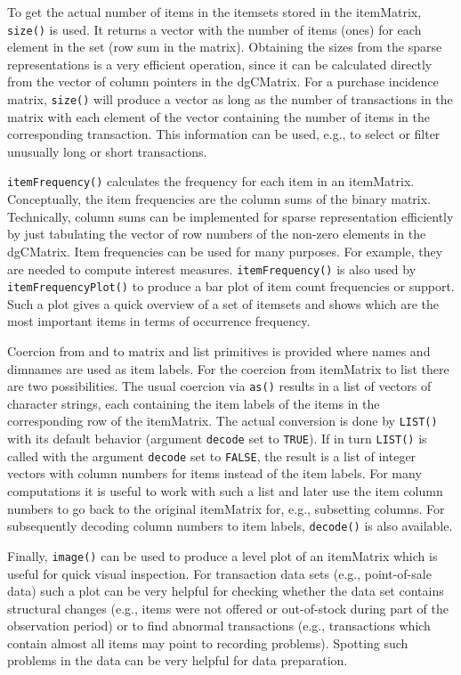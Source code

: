 \documentclass[10pt,a4paper]{article}
\newcommand{\class}[1]{\mbox{\textsf{#1}}}
\newcommand{\func}[1]{\mbox{\texttt{#1()}}}
\newcommand{\code}[1]{\mbox{\texttt{#1}}}
\begin{document}
To get the actual number of items in the itemsets stored in the
\class{itemMatrix}, \func{size} is used.  It returns a vector with the
number of items (ones) for each element in the set (row sum in the
matrix).  Obtaining the sizes from the sparse representations is a very
efficient operation, since it can be calculated directly from the vector
of column pointers in the \class{dgCMatrix}.  For a purchase incidence
matrix, \func{size} will produce a vector as long as the number of
transactions in the matrix with each element of the vector containing
the number of items in the corresponding transaction.  This information
can be used, e.g., to select or filter unusually long or short
transactions.

\func{itemFrequency} calculates the frequency for each 
item in an \class{itemMatrix}. Conceptually, the item frequencies
are the column sums of the binary matrix. Technically, 
column sums can be implemented
for sparse representation efficiently by just
tabulating the vector of row numbers of the non-zero elements in
the \class{dgCMatrix}.
Item frequencies can be used for many purposes. 
For example, they are needed to compute interest measures.
\func{itemFrequency} is also used by \func{itemFrequencyPlot} 
to produce a bar plot of item count frequencies or support. 
Such a plot gives a quick overview of a set of itemsets 
and shows which are the most important 
items in terms of occurrence frequency.


Coercion from and to \class{matrix} and \class{list} primitives is
provided where names and dimnames are used as item labels.  For the
coercion from \class{itemMatrix} to \class{list} there are two
possibilities.  The usual coercion via \func{as} results in a list of
vectors of character strings, each containing the item labels of the
items in the corresponding row of the \class{itemMatrix}.  The actual
conversion is done by \func{LIST} with its default behavior (argument
\code{decode} set to \code{TRUE}).  If in turn \func{LIST} is called
with the argument \code{decode} set to \code{FALSE}, the result is a
list of integer vectors with column numbers for items instead of the
item labels. For many computations it is useful to work with such a list
and later use the item column numbers to go back to the original
\class{itemMatrix} for, e.g., subsetting columns.  For subsequently
decoding column numbers to item labels, \func{decode} is also available.

Finally, \func{image} can be used to produce a level plot of an
\class{itemMatrix} which is useful for quick visual inspection.  For
transaction data sets (e.g., point-of-sale data) such a plot can be very
helpful for checking whether the data set contains structural changes (e.g.,
items were not offered or out-of-stock during part of the observation
period) or to find abnormal transactions (e.g., transactions which
contain almost all items may point to recording problems).  Spotting
such problems in the data can be very helpful for data preparation.
\end{document}
